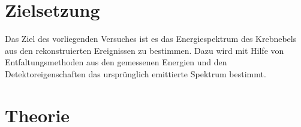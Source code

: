 \section{Zielsetzung}
Das Ziel des vorliegenden Versuches ist es das Energiespektrum des Krebnebels aus den rekonstruierten Ereignissen zu bestimmen. Dazu wird mit Hilfe von Entfaltungsmethoden aus den gemessenen Energien und den Detektoreigenschaften das ursprünglich emittierte Spektrum bestimmt.
\section{Theorie}

\cite{anleitung}
